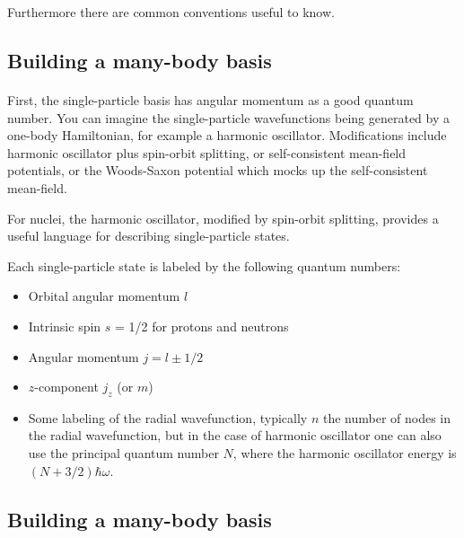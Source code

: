 \documentclass[%
twoside,                 %
final,                   %
10pt]{article}
\begin{document}
Furthermore there are common conventions useful to know.




\subsection{Building a many-body basis}

\paragraph{}
First, the single-particle basis has angular momentum as a good quantum number.  You can 
imagine the single-particle wavefunctions being generated by a one-body Hamiltonian, 
for example a harmonic oscillator.  Modifications include harmonic oscillator plus 
spin-orbit splitting, or self-consistent mean-field potentials, or the Woods-Saxon potential which mocks 
up the self-consistent mean-field. 


For nuclei, the harmonic oscillator, modified by spin-orbit splitting, provides a useful language 
for describing single-particle states.


Each single-particle state is labeled by the following quantum numbers: 

\begin{itemize}
\item Orbital angular momentum $l$

\item Intrinsic spin $s$ = 1/2 for protons and neutrons

\item Angular momentum $j = l \pm 1/2$

\item $z$-component $j_z$ (or $m$)

\item Some labeling of the radial wavefunction, typically $n$ the number of nodes in  the radial wavefunction, but in the case of harmonic oscillator one can also use the principal quantum number $N$, where the harmonic oscillator energy is $(N+3/2)\hbar \omega$. 
\end{itemize}

\noindent




\subsection{Building a many-body basis}
\end{document}
